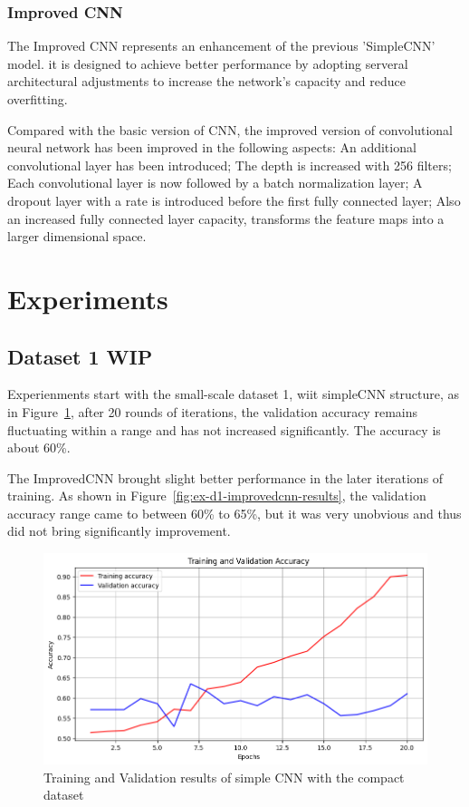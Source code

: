 \documentclass[final]{cvpr}
\begin{document}
\subsubsection{Improved CNN}

The Improved CNN represents an enhancement of the previous 'SimpleCNN' model. it is designed to achieve better performance by adopting serveral architectural adjustments to increase the network's capacity and reduce overfitting.

Compared with the basic version of CNN, the improved version of convolutional neural network has been improved in the following aspects: An additional convolutional layer has been introduced; The depth is increased with 256 filters; Each convolutional layer is now followed by a batch normalization layer; A dropout layer with a rate is introduced before the first fully connected layer; Also an increased fully connected layer capacity, transforms the feature maps into a larger dimensional space.


\section{Experiments}

\subsection{Dataset 1 WIP}

Experienments start with the small-scale dataset 1, wiit simpleCNN structure, as in Figure~\ref*{fig:ex-d1-simplecnn-results}, after 20 rounds of iterations, the validation accuracy remains fluctuating within a range and has not increased significantly. The accuracy is about 60\%.

The ImprovedCNN brought slight better performance in the later iterations of training. As shown in Figure~\ref*{fig:ex-d1-improvedcnn-results}, the validation accuracy range came to between 60\% to 65\%, but it was very unobvious and thus did not bring significantly improvement.

\begin{figure}[t]
   \centering
   \includegraphics[width=0.9\linewidth]{img/ex-d1-simplecnn-accuracy-results.png}
   \caption{Training and Validation results of simple CNN with the compact dataset}
   \label{fig:ex-d1-simplecnn-results}
\end{figure}
\end{document}
